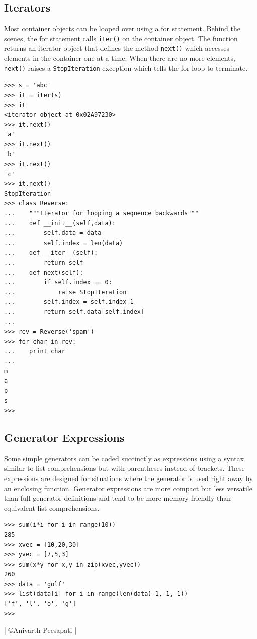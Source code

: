 \documentclass[12pt,a4paper]{article}
\begin{document}
\subsection{Iterators}
Most container objects can be looped over using a for statement. Behind the scenes, the for statement calls \texttt{iter()} on the container object. The function returns an iterator object that defines the method \texttt{next()} which accesses elements in the container one at a time. When there are no more elements, \texttt{next()} raises a \texttt{StopIteration} exception which tells the for loop to terminate.
\begin{verbatim}
>>> s = 'abc'
>>> it = iter(s)
>>> it
<iterator object at 0x02A97230>
>>> it.next()
'a'
>>> it.next()
'b'
>>> it.next()
'c'
>>> it.next()
StopIteration
>>> class Reverse:
...    """Iterator for looping a sequence backwards"""
...    def __init__(self,data):
...        self.data = data
...        self.index = len(data)
...    def __iter__(self):
...        return self
...    def next(self):
...        if self.index == 0:
...            raise StopIteration
...        self.index = self.index-1
...        return self.data[self.index]
...
>>> rev = Reverse('spam')
>>> for char in rev:
...    print char
...
m
a
p
s
>>> 
\end{verbatim}
\subsection{Generator Expressions}
Some simple generators can be coded succinctly as expressions using a syntax similar to list comprehensions but
with parentheses instead of brackets. These expressions are designed for situations where the generator is used
right away by an enclosing function. Generator expressions are more compact but less versatile than full generator
definitions and tend to be more memory friendly than equivalent list comprehensions.
\begin{verbatim}
>>> sum(i*i for i in range(10))
285
>>> xvec = [10,20,30]
>>> yvec = [7,5,3]
>>> sum(x*y for x,y in zip(xvec,yvec))
260
>>> data = 'golf'
>>> list(data[i] for i in range(len(data)-1,-1,-1))
['f', 'l', 'o', 'g']
>>> 
\end{verbatim}
\vspace{3cm}
\begin{center}
{\Huge | \copyright  Anivarth Peesapati |}
\end{center}
\end{document}
